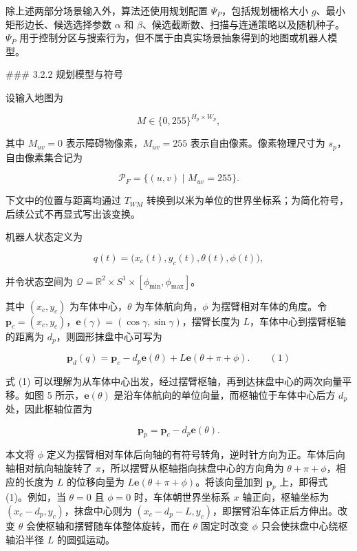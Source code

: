 除上述两部分场景输入外，算法还使用规划配置 $\Psi_P$，包括规划栅格大小 $g$、最小矩形边长、候选选择参数 $\alpha$ 和 $\beta$、候选截断数、扫描与连通策略以及随机种子。$\Psi_P$ 用于控制分区与搜索行为，但不属于由真实场景抽象得到的地图或机器人模型。

  

### 3.2.2 规划模型与符号

  

设输入地图为

  

$$
M\in\{0,255\}^{H_p\times W_p},
$$

  

其中 $M_{uv}=0$ 表示障碍物像素，$M_{uv}=255$ 表示自由像素。像素物理尺寸为 $s_p$，自由像素集合记为

  

$$
\mathcal P_F=\{(u,v)\mid M_{uv}=255\}.
$$

  

下文中的位置与距离均通过 $T_{WM}$ 转换到以米为单位的世界坐标系；为简化符号，后续公式不再显式写出该变换。


  

机器人状态定义为

  

$$
q(t)=\bigl(x_c(t),y_c(t),\theta(t),\phi(t)\bigr),
$$

并令状态空间为 $\mathcal Q=\mathbb R^2\times S^1\times[\phi_{\min},\phi_{\max}]$。

  

其中 $(x_c,y_c)$ 为车体中心，$\theta$ 为车体航向角，$\phi$ 为摆臂相对车体的角度。令 $\mathbf p_c=(x_c,y_c)$，$\mathbf e(\gamma)=(\cos\gamma,\sin\gamma)$，摆臂长度为 $L$，车体中心到摆臂枢轴的距离为 $d_p$，则圆形抹盘中心可写为

  

$$
\mathbf p_d(q)
=\mathbf p_c-d_p\mathbf e(\theta)
+L\mathbf e(\theta+\pi+\phi).
\qquad(1)
$$

式 (1) 可以理解为从车体中心出发，经过摆臂枢轴，再到达抹盘中心的两次向量平移。如图 5 所示，$\mathbf e(\theta)$ 是沿车体航向的单位向量，而枢轴位于车体中心后方 $d_p$ 处，因此枢轴位置为

$$
\mathbf p_p=\mathbf p_c-d_p\mathbf e(\theta).
$$

本文将 $\phi$ 定义为摆臂相对车体后向轴的有符号转角，逆时针方向为正。车体后向轴相对航向轴旋转了 $\pi$，所以摆臂从枢轴指向抹盘中心的方向角为 $\theta+\pi+\phi$，相应的长度为 $L$ 的位移向量为 $L\mathbf e(\theta+\pi+\phi)$。将该向量加到 $\mathbf p_p$ 上，即得式 (1)。例如，当 $\theta=0$ 且 $\phi=0$ 时，车体朝世界坐标系 $x$ 轴正向，枢轴坐标为 $(x_c-d_p,y_c)$，抹盘中心则为 $(x_c-d_p-L,y_c)$，即摆臂沿车体正后方伸出。改变 $\theta$ 会使枢轴和摆臂随车体整体旋转，而在 $\theta$ 固定时改变 $\phi$ 只会使抹盘中心绕枢轴沿半径 $L$ 的圆弧运动。

